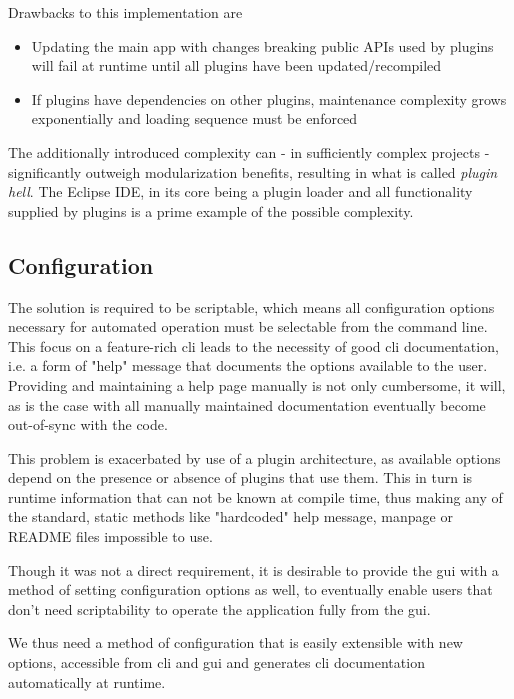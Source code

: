 Drawbacks to this implementation are
\begin{itemize}
	\item Updating the main app with changes breaking public APIs used by plugins will fail at runtime until all plugins have been updated/recompiled
	\item If plugins have dependencies on other plugins, maintenance complexity grows exponentially and loading sequence must be enforced
\end{itemize}

The additionally introduced complexity can - in sufficiently complex projects - significantly outweigh modularization benefits, resulting in what is called \textit{plugin hell}.
The Eclipse IDE, in its core being a plugin loader and all functionality supplied by plugins is a prime example of the possible complexity.



\subsection{Configuration}
The solution is required to be scriptable, which means all configuration options necessary for automated operation must be selectable from the command line.
This focus on a feature-rich \gls{cli} leads to the necessity of good \gls{cli} documentation, i.e. a form of "help" message that documents the options available to the user.
Providing and maintaining a help page manually is not only cumbersome, it will, as is the case with all manually maintained documentation eventually become out-of-sync with the code.

This problem is exacerbated by use of a plugin architecture, as available options depend on the presence or absence of plugins that use them. This in turn is runtime information that can not be known at compile time, thus making any of the standard, static methods like "hardcoded" help message, manpage or README files impossible to use.

Though it was not a direct requirement, it is desirable to provide the \gls{gui} with a method of setting configuration options as well, to eventually enable users that don't need scriptability to operate the application fully from the \gls{gui}.

We thus need a method of configuration that is easily extensible with new options, accessible from \gls{cli} and \gls{gui} and generates \gls{cli} documentation automatically at runtime.

